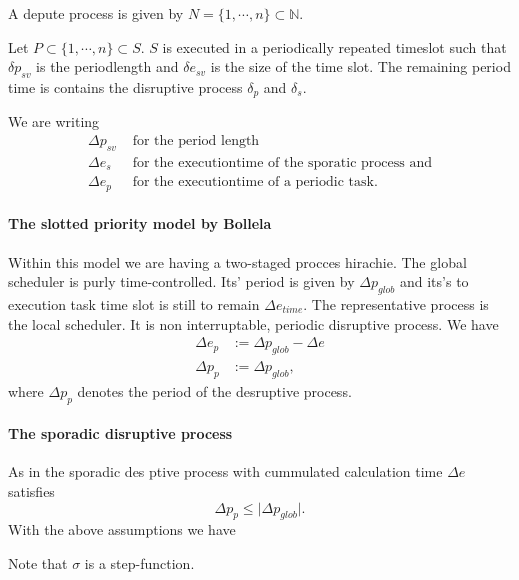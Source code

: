 A depute process is given by $ N = \{1, \cdots, n\}\subset \mathbb{N}$. 

Let $P \subset \{1, \cdots, n\} \subset S$.
$S$ is executed in a periodically repeated timeslot such that $\delta p_{sv}$ is the periodlength and $\delta e_{sv}$ is the size of the time slot.
The remaining period time is contains the  disruptive process $\delta_p$ and $\delta_s$.

We are writing
\begin{align}
	\Delta p_{sv} &\text{ for the period length} \\
	\Delta e_s &\text{ for the executiontime of the sporatic process and}\\ 
	\Delta e_p &\text{ for the executiontime of a periodic task.}
\end{align}

\paragraph{The slotted priority model by Bollela}

Within this model we are having a two-staged procces hirachie. 
The global scheduler is purly time-controlled.
Its' period is given by $\Delta p_{glob}$ and its's to execution task time slot is still to remain $\Delta e_{time}$.
The representative process is the local scheduler. 
It is non interruptable, periodic disruptive process.
We have
\begin{align}
\Delta e_p &:= \Delta p_{glob} - \Delta e\\
\Delta p_{p} &:= \Delta p_{glob}, 
\end{align}
where $\Delta p_{p}$ denotes the period of the desruptive process.

\paragraph{The sporadic disruptive process}
As in \cite{K} the sporadic des
ptive process with cummulated calculation time $\Delta e$ satisfies
\begin{equation}
\Delta p_{p} \leq \lvert{\Delta p_{glob}} \rvert. 
\end{equation}
With the above assumptions we have

\begin{theorem}
\end{theorem}

\begin{remark}
Note that $\sigma$ is a step-function. 
\end{remark}

